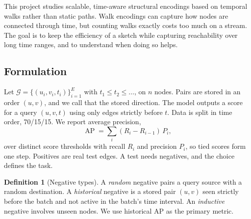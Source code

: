 \documentclass[11pt,a4paper]{article}
\theoremstyle{plain}
\theoremstyle{definition}
\newtheorem{definition}{Definition}
\DeclareMathOperator{\AP}{AP}
\begin{document}
This project studies scalable, time-aware structural encodings based on temporal walks rather than static paths. Walk encodings can capture how nodes are connected through time, but counting walks exactly costs too much on a stream. The goal is to keep the efficiency of a sketch while capturing reachability over long time ranges, and to understand when doing so helps.

\subsection{Formulation}\label{sec:problem}
Let $\mathcal{G}=\{(u_i,v_i,t_i)\}_{i=1}^{E}$ with $t_1\le t_2\le\dots$, on $n$ nodes. Pairs are stored in an order $(u,v)$, and we call that the stored direction. The model outputs a score for a query $(u,v,t)$ using only edges strictly before $t$. Data is split in time order, 70/15/15. We report average precision,
\begin{equation}\label{eq:ap}
\AP=\sum_{i}(R_i-R_{i-1})\,P_i,
\end{equation}
over distinct score thresholds with recall $R_i$ and precision $P_i$, so tied scores form one step. Positives are real test edges. A test needs negatives, and the choice defines the task.
\begin{definition}[Negative types]
A \emph{random} negative pairs a query source with a random destination. A \emph{historical} negative \cite{poursafaei} is a stored pair $(u,v)$ seen strictly before the batch and not active in the batch's time interval. An \emph{inductive} negative involves unseen nodes. We use historical AP as the primary metric.
\end{definition}
\end{document}
